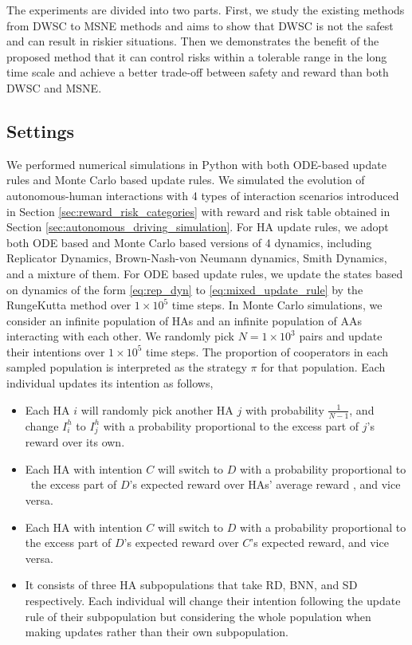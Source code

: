 \documentclass[letterpaper]{article} %
\newcommand{\todo}[1]{\textcolor{blue}{(Todo:  #1)}}
\begin{document}
The experiments are divided into two parts. First, we study the existing methods from DWSC to MSNE methods and aims to show that DWSC is not the safest and can result in riskier situations. Then we demonstrates the benefit of the proposed method that it can control risks within a tolerable range in the long time scale and achieve a better trade-off between safety and reward than both DWSC and MSNE. 

\subsection{Settings}
We performed numerical simulations in Python with both ODE-based update rules and Monte Carlo based update rules. 
We simulated the evolution of autonomous-human interactions with 4 types of interaction scenarios
introduced in Section \ref{sec:reward_risk_categories} 
with reward and risk table obtained in Section 
\ref{sec:autonomous_driving_simulation}. For HA update rules, we adopt both ODE based and Monte Carlo based versions of 4 dynamics, including Replicator Dynamics, Brown-Nash-von Neumann dynamics, Smith Dynamics, and a mixture of them.
For ODE based update rules, we update the states based on dynamics of the form \eqref{eq:rep_dyn} to \eqref{eq:mixed_update_rule} by the RungeKutta method \cite{runge1895numerische} over $1\times10^5$ time steps. 
In Monte Carlo simulations, we consider an infinite population of HAs and an infinite population of AAs interacting with each other. We randomly pick $N=1\times10^3$ pairs and update their intentions over $1\times10^5$ time steps. The proportion of cooperators in each sampled population is interpreted as the strategy $\pi$ for that population. Each individual updates its intention as follows,
\begin{itemize}
    \item {} Each HA $i$ will randomly pick another HA $j$ with probability $\frac{1}{N-1}$, and change $I^h_i$ to $I^h_j$ with a probability proportional to the excess part of $j$'s reward over its own.
    \item {} Each HA
    with intention $C$ will switch to $D$ with a probability proportional to \
    the excess part of $D$'s expected reward over HAs' average reward
    , and vice versa.
    \item {} Each HA with intention $C$ will switch to $D$ with a probability proportional to the excess part of $D$'s expected reward over $C$'s expected reward, and vice versa.
    \item \text{Mixed Dynamics:} It consists of three HA subpopulations that take RD, BNN, and SD respectively. Each individual will change their intention following the update rule of their subpopulation but considering the whole population when making updates rather than their own subpopulation.
\end{itemize}
\end{document}
